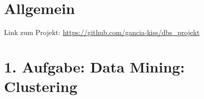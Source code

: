 \usepackage{graphicx}
\usepackage{listings} %

\newcommand{\dozent}{Prof.  Dr.  Agnès Voisard, Nicolas Lehmann}					%
\newcommand{\tutor}{Hoffman Christian}						%
\newcommand{\tutoriumNo}{ 3, Gruppe 22}				%
\newcommand{\projectNo}{3. Iteration}									%
\newcommand{\veranstaltung}{Datenbank Systeme}	%
\newcommand{\semester}{SoeSe 2017}						%
\newcommand{\studenten}{Ingrid Tchilibou, Emil Milanov, Boyan Hristov}			%






\section*{Allgemein}
Link zum Projekt: \url{https://github.com/gancia-kiss/dbs_projekt}


\section*{1. Aufgabe: Data Mining: Clustering}

